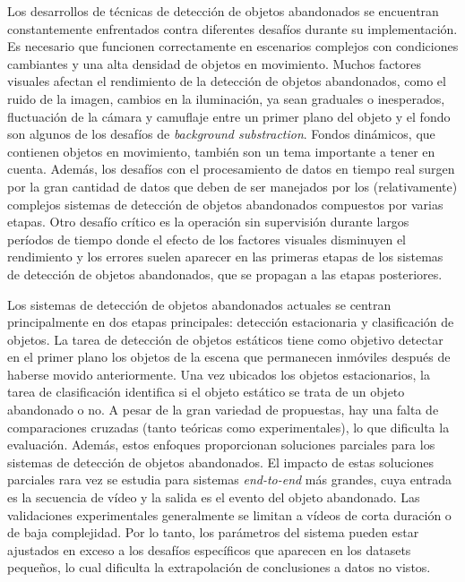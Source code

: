 Los desarrollos de técnicas de detección de objetos abandonados se encuentran constantemente enfrentados contra diferentes desafíos durante su implementación. Es necesario que funcionen correctamente en escenarios complejos con condiciones cambiantes y una alta densidad de objetos en movimiento. Muchos factores visuales afectan el rendimiento de la detección de objetos abandonados, como el ruido de la imagen, cambios en la iluminación, ya sean graduales o inesperados, fluctuación de la cámara y camuflaje entre un primer plano del objeto y el fondo son algunos de los desafíos de \textit{background substraction}. Fondos dinámicos, que contienen objetos en movimiento, también son un tema importante a tener en cuenta. Además, los desafíos con el procesamiento de datos en tiempo real surgen por la gran cantidad de datos que deben de ser manejados por los (relativamente) complejos sistemas de detección de objetos abandonados compuestos por varias etapas. Otro desafío crítico es la operación sin supervisión durante largos períodos de tiempo donde el efecto de los factores visuales disminuyen el rendimiento y los errores suelen aparecer en las primeras etapas de los sistemas de detección de objetos abandonados, que se propagan a las etapas posteriores.

Los sistemas de detección de objetos abandonados actuales se centran principalmente en dos etapas principales: detección estacionaria y clasificación de objetos. La tarea de detección de objetos estáticos tiene como objetivo detectar en el primer plano los objetos de la escena que permanecen inmóviles después de haberse movido anteriormente. Una vez ubicados los objetos estacionarios, la tarea de clasificación identifica si el objeto estático se trata de un objeto abandonado o no. A pesar de la gran variedad de propuestas, hay una falta de comparaciones cruzadas (tanto teóricas como experimentales), lo que dificulta la evaluación. Además, estos enfoques proporcionan soluciones parciales para los sistemas de detección de objetos abandonados. El impacto de estas soluciones parciales rara vez se estudia para sistemas \textit{end-to-end} más grandes, cuya entrada es la secuencia de vídeo y la salida es el evento del objeto abandonado. Las validaciones experimentales generalmente se limitan a vídeos de corta duración o de baja complejidad. Por lo tanto, los parámetros del sistema pueden estar ajustados en exceso a los desafíos específicos que aparecen en los datasets pequeños, lo cual dificulta la extrapolación de conclusiones a datos no vistos.

